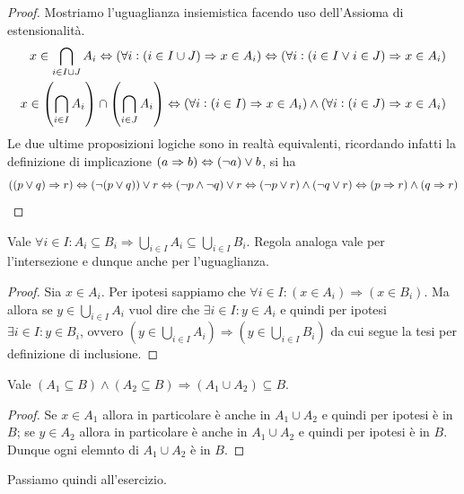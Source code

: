 \documentclass[a4paper]{article}\par \usepackage{style}\par
\begin{document}
\begin{proof}
  Mostriamo l'uguaglianza insiemistica facendo uso dell'Assioma di estensionalità.
  \begin{align*}
    x \in \bigcap_{i \in I \cup J} A_i \Leftrightarrow (\forall i : (i \in I \cup J) \Rightarrow x \in A_i ) \Leftrightarrow (\forall i : (i \in I \vee i \in J) \Rightarrow x \in A_i ) \\
    x \in \left (\bigcap_{i \in I} A_i \right ) \cap \left (\bigcap_{i \in J} A_i \right ) \Leftrightarrow  (\forall i : (i \in I) \Rightarrow x \in A_i) \wedge (\forall i : (i \in J) \Rightarrow x \in A_i)
  \end{align*}
  Le due ultime proposizioni logiche sono in realtà equivalenti, ricordando infatti la definizione di implicazione $ (a \Rightarrow b) \Leftrightarrow (\neg a) \vee b $, si ha
  \[((p \vee q) \Rightarrow r) \Leftrightarrow (\neg (p \vee q)) \vee r \Leftrightarrow (\neg p \wedge \neg q) \vee r \Leftrightarrow (\neg p \vee r) \wedge (\neg q \vee r) \Leftrightarrow (p \Rightarrow r) \wedge (q \Rightarrow r) \qedhere\]
\end{proof}\par \begin{lemma}
  Vale $ \forall i \in I : A_i \subseteq B_i \Rightarrow \bigcup_{i \in I} A_i \subseteq \bigcup_{i \in I} B_i $. Regola analoga vale per l'intersezione e dunque anche per l'uguaglianza.
\end{lemma}
\begin{proof}
  Sia $ x \in A_i $. Per ipotesi sappiamo che $ \forall i \in I: (x \in A_i) \Rightarrow (x \in B_i) $. Ma allora se $ y \in \bigcup_{i \in I} A_i $ vuol dire che $ \exists i \in I : y \in A_i $ e quindi per ipotesi $ \exists i \in I : y \in B_i $, ovvero $ (y \in \bigcup_{i \in I} A_i) \Rightarrow (y \in \bigcup_{i \in I} B_i)  $ da cui segue la tesi per definizione di inclusione.
\end{proof}\par \begin{lemma}
  Vale $ 	(A_1 \subseteq B) \wedge (A_2 \subseteq B) \Rightarrow (A_1 \cup A_2) \subseteq B $.
\end{lemma}
\begin{proof}
  Se $ x \in A_1 $ allora in particolare è anche in $ A_1 \cup A_2 $ e quindi per ipotesi è in $ B $; se $ y \in A_2 $ allora in particolare è anche in $ A_1 \cup A_2 $ e quindi per ipotesi è in $ B $. Dunque ogni elemnto di $ A_1 \cup A_2 $ è in $ B $.
\end{proof}\par Passiamo quindi all'esercizio.
\end{document}
